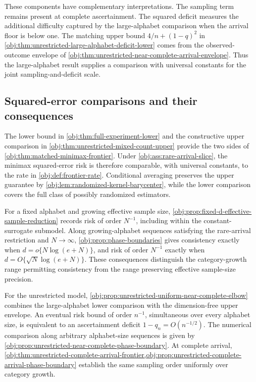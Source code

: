 \documentclass[11pt]{article}
\begin{document}
These components have complementary interpretations. The sampling term remains present at complete ascertainment. The squared deficit measures the additional difficulty captured by the large-alphabet comparison when the arrival floor is below one. The matching upper bound \(4/n+(1-q)^2\) in \cref{obj:thm:unrestricted-large-alphabet-deficit-lower} comes from the observed-outcome envelope of \cref{obj:thm:unrestricted-near-complete-arrival-envelope}. Thus the large-alphabet result supplies a comparison with universal constants for the joint sampling-and-deficit scale.

\subsection{Squared-error comparisons and their consequences}

The lower bound in \cref{obj:thm:full-experiment-lower} and the constructive upper comparison in \cref{obj:thm:unrestricted-mixed-count-upper} provide the two sides of \cref{obj:thm:matched-minimax-frontier}. Under \cref{obj:ass:rare-arrival-slice}, the minimax squared-error risk is therefore comparable, with universal constants, to the rate in \cref{obj:def:frontier-rate}. Conditional averaging preserves the upper guarantee by \cref{obj:lem:randomized-kernel-barycenter}, while the lower comparison covers the full class of possibly randomized estimators.

For a fixed alphabet and growing effective sample size, \cref{obj:prop:fixed-d-effective-sample-reduction} records risk of order \(N^{-1}\), including within the constant-surrogate submodel. Along growing-alphabet sequences satisfying the rare-arrival restriction and \(N\to\infty\), \cref{obj:prop:phase-boundaries} gives consistency exactly when \(d=o\{N\log(e+N)\}\), and risk of order \(N^{-1}\) exactly when \(d=O\{\sqrt N\log(e+N)\}\). These consequences distinguish the category-growth range permitting consistency from the range preserving effective sample-size precision.

For the unrestricted model, \cref{obj:prop:unrestricted-uniform-near-complete-elbow} combines the large-alphabet lower comparison with the dimension-free upper envelope. An eventual risk bound of order \(n^{-1}\), simultaneous over every alphabet size, is equivalent to an ascertainment deficit \(1-q_n=O(n^{-1/2})\). The numerical comparison along arbitrary alphabet-size sequences is given by \cref{obj:prop:unrestricted-near-complete-phase-boundary}. At complete arrival, \cref{obj:thm:unrestricted-complete-arrival-frontier,obj:prop:unrestricted-complete-arrival-phase-boundary} establish the same sampling order uniformly over category growth.
\end{document}
